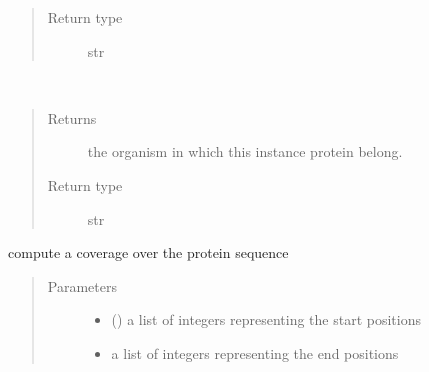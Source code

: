 \documentclass[letterpaper,10pt,english]{sphinxmanual}
\begin{document}
\begin{fulllineitems}
\begin{fulllineitems}
\begin{quote}
\begin{description}
\item[{Return type}] \leavevmode
str

\end{description}\end{quote}

\end{fulllineitems}


\begin{fulllineitems}
\label{\detokenize{IPTK.Classes:IPTK.Classes.Protein.Protein.get_org}}~\begin{quote}\begin{description}
\item[{Returns}] \leavevmode
the organism in which this instance protein belong.

\item[{Return type}] \leavevmode
str

\end{description}\end{quote}

\end{fulllineitems}


\begin{fulllineitems}
\label{\detokenize{IPTK.Classes:IPTK.Classes.Protein.Protein.get_peptides_map}}
compute a coverage over the protein sequence
\begin{quote}\begin{description}
\item[{Parameters}] \leavevmode\begin{itemize}
\item {} 
 () \textendash{} a list of integers representing the start positions

\item {} 
 \textendash{} a list of integers representing the end positions


\end{itemize}
\end{description}
\end{quote}
\end{fulllineitems}
\end{fulllineitems}
\end{document}
